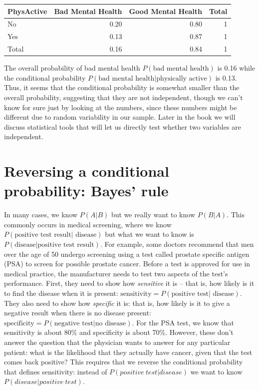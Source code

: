 \documentclass[12pt,]{book}
\theoremstyle{definition}
\theoremstyle{definition}
\theoremstyle{definition}
\theoremstyle{remark}
\begin{document}
\begin{tabular}{l|r|r|r}
\hline
PhysActive & Bad Mental Health & Good Mental Health & Total\\
\hline
No & 0.20 & 0.80 & 1\\
\hline
Yes & 0.13 & 0.87 & 1\\
\hline
Total & 0.16 & 0.84 & 1\\
\hline
\end{tabular}

The overall probability of bad mental health \(P(\text{bad mental health})\) is 0.16 while the conditional probability \(P(\text{bad mental health|physically active})\) is 0.13. Thus, it seems that the conditional probability is somewhat smaller than the overall probability, suggesting that they are not independent, though we can't know for sure just by looking at the numbers, since these numbers might be different due to random variability in our sample. Later in the book we will discuss statistical tools that will let us directly test whether two variables are independent.

\hypertarget{bayestheorem}{%
\section{Reversing a conditional probability: Bayes' rule}\label{bayestheorem}}

In many cases, we know \(P(A|B)\) but we really want to know \(P(B|A)\). This commonly occurs in medical screening, where we know \(P(\text{positive test result| disease})\) but what we want to know is \(P(\text{disease|positive test result})\). For example, some doctors recommend that men over the age of 50 undergo screening using a test called prostate specific antigen (PSA) to screen for possible prostate cancer. Before a test is approved for use in medical practice, the manufacturer needs to test two aspects of the test's performance. First, they need to show how \emph{sensitive} it is -- that is, how likely is it to find the disease when it is present: \(\text{sensitivity} = P(\text{positive test| disease})\). They also need to show how \emph{specific} it is: that is, how likely is it to give a negative result when there is no disease present: \(\text{specificity} = P(\text{negative test|no disease})\). For the PSA test, we know that sensitivity is about 80\% and specificity is about 70\%. However, these don't answer the question that the physician wants to answer for any particular patient: what is the likelihood that they actually have cancer, given that the test comes back positive? This requires that we reverse the conditional probability that defines sensitivity: instead of \(P(positive\ test| disease)\) we want to know \(P(disease|positive\ test)\).
\end{document}
